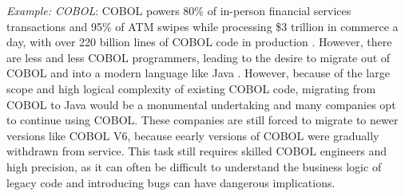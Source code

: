 \begin{tcolorbox}[colback=lightblue, boxrule=0pt, arc=5pt, outer arc=5pt]
\textit{Example: COBOL}: COBOL powers 80\% of in-person financial services transactions and 95\% of ATM swipes while processing \$3 trillion in commerce a day, with over 220 billion lines of COBOL code in production \citep{Taulli_2020}. However, there are less and less COBOL programmers, leading to the desire to migrate out of COBOL and into a modern language like Java \citep{sneed2001extracting, sellink2002restructuring, sneed2010migrating}. However, because of the large scope and high logical complexity of existing COBOL code, migrating from COBOL to Java would be a monumental undertaking and many companies opt to continue using COBOL. These companies are still forced to migrate to newer versions like COBOL V6, because eearly versions of COBOL were gradually withdrawn from service. This task still requires skilled COBOL engineers and high precision, as it can often be difficult to understand the business logic of legacy code and introducing bugs can have dangerous implications. 
\end{tcolorbox}





